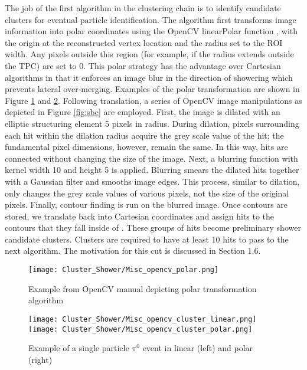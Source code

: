 \par The job of the first algorithm in the clustering chain is to identify candidate clusters for eventual particle identification. The algorithm first transforms image information into polar coordinates using the OpenCV linearPolar function \cite{bib:linearPolar}, with the origin at the reconstructed vertex location and the radius set to the ROI width.  Any pixels outside this region (for example, if the radius extends outside the TPC) are set to 0. This polar strategy has the advantage over Cartesian algorithms in that it enforces an image blur in the direction of showering which prevents lateral over-merging. Examples of the polar transformation are shown in Figure \ref{fig:polar} and \ref{fig:pi0_polar}. Following translation, a series of OpenCV image manipulations as depicted in Figure \ref{fig:sbc} are employed. First, the image is dilated \cite{bib:dilate} with an elliptic structuring element \cite{bib:structuringElement} 5 pixels in radius. During dilation, pixels surrounding each hit within the dilation radius acquire the grey scale value of the hit; the fundamental pixel dimensions, however, remain the same. In this way, hits are connected without changing the size of the image. Next, a blurring function \cite{bib:blur} with kernel width 10 and height 5 is applied. Blurring smears the dilated hits together with a Gaussian filter and smooths image edges. This process, similar to dilation, only changes the grey scale values of various pixels, not the size of the original pixels. Finally, contour finding \cite{bib:contourFinding} is run on the blurred image.  Once contours are stored, we translate back into Cartesian coordinates and assign hits to the contours that they fall inside of \cite{bib:pointPolygon}. These groups of hits become preliminary shower candidate clusters.  Clusters are required to have at least 10 hits to pass to the next algorithm. The motivation for this cut is discussed in Section 1.6.

\begin{figure}[H]
\centering
\texttt{[image: Cluster\_Shower/Misc\_opencv\_polar.png]}
\caption{ Example from OpenCV manual depicting polar transformation algorithm \cite{bib:linearPolar}}
\label{fig:polar}
\end{figure}

\begin{figure}[h!]
\centering
\texttt{[image: Cluster\_Shower/Misc\_opencv\_cluster\_linear.png]}
\texttt{[image: Cluster\_Shower/Misc\_opencv\_cluster\_polar.png]}
\caption{ Example of a single particle $\pi^0$ event in linear (left) and polar (right)}
\label{fig:pi0_polar}
\end{figure}


